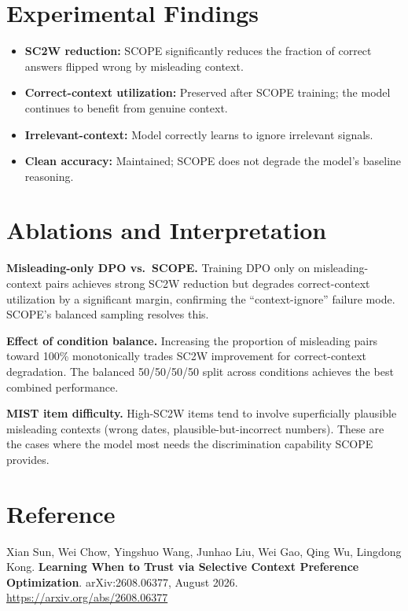 \documentclass[10pt,twocolumn]{article}
\begin{document}
\section{Experimental Findings}

\begin{itemize}[itemsep=2pt,parsep=0pt]
  \item \textbf{SC2W reduction:} SCOPE significantly reduces the fraction of
    correct answers flipped wrong by misleading context.
  \item \textbf{Correct-context utilization:} Preserved after SCOPE training;
    the model continues to benefit from genuine context.
  \item \textbf{Irrelevant-context:} Model correctly learns to ignore
    irrelevant signals.
  \item \textbf{Clean accuracy:} Maintained; SCOPE does not degrade the model's
    baseline reasoning.
\end{itemize}

\section{Ablations and Interpretation}

\textbf{Misleading-only DPO vs.\ SCOPE.}
Training DPO only on misleading-context pairs achieves strong SC2W reduction
but degrades correct-context utilization by a significant margin, confirming
the ``context-ignore'' failure mode. SCOPE's balanced sampling resolves this.

\textbf{Effect of condition balance.}
Increasing the proportion of misleading pairs toward 100\% monotonically
trades SC2W improvement for correct-context degradation. The balanced
50/50/50/50 split across conditions achieves the best combined performance.

\textbf{MIST item difficulty.}
High-SC2W items tend to involve superficially plausible misleading contexts
(wrong dates, plausible-but-incorrect numbers). These are the cases where
the model most needs the discrimination capability SCOPE provides.

\section*{Reference}

Xian Sun, Wei Chow, Yingshuo Wang, Junhao Liu, Wei Gao, Qing Wu, Lingdong Kong.
\textbf{Learning When to Trust via Selective Context Preference Optimization}.
arXiv:2608.06377, August 2026.
\url{https://arxiv.org/abs/2608.06377}
\end{document}
